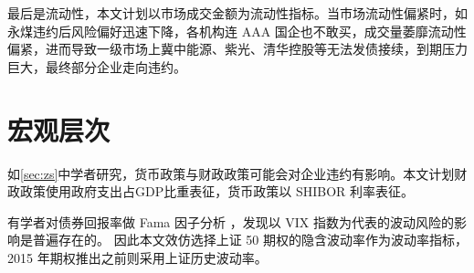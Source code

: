 最后是流动性，本文计划以市场成交金额为流动性指标。当市场流动性偏紧时，如永煤违约后风险偏好迅速下降，各机构连 AAA 国企也不敢买，成交量萎靡流动性偏紧，进而导致一级市场上冀中能源、紫光、清华控股等无法发债接续，到期压力巨大，最终部分企业走向违约。
\section{宏观层次}
如\ref{sec:zs}中学者研究，货币政策与财政政策可能会对企业违约有影响。本文计划财政政策使用政府支出占GDP比重表征，货币政策以 SHIBOR 利率表征。

有学者对债券回报率做 Fama 因子分析
\cite{chung2019volatility}
，发现以 VIX 指数为代表的波动风险的影响是普遍存在的。
因此本文效仿选择上证 50 期权的隐含波动率作为波动率指标，2015 年期权推出之前则采用上证历史波动率。
